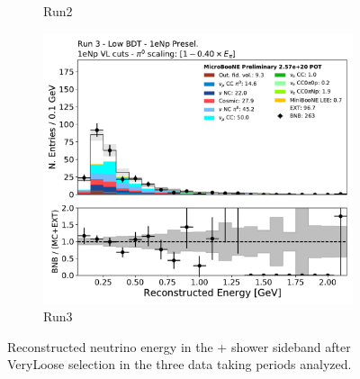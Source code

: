 \begin{figure}[H]
\begin{center}
\begin{subfigure}{0.32\textwidth}
    \caption{Run2}
    \end{subfigure}
    \begin{subfigure}{0.32\textwidth}
    \includegraphics[width=1.00\textwidth]{Sidebands/Figures/1eNp/TimeDependence/reco_e_LPID_NPVL_Run3.pdf}
    \caption{Run3}
    \end{subfigure}
    \caption{\label{fig:sb:1eNp:time:lpid:vl:recoe} Reconstructed neutrino energy in the + shower sideband after VeryLoose selection in the three data taking periods analyzed.}
    \end{center}
\end{figure}

